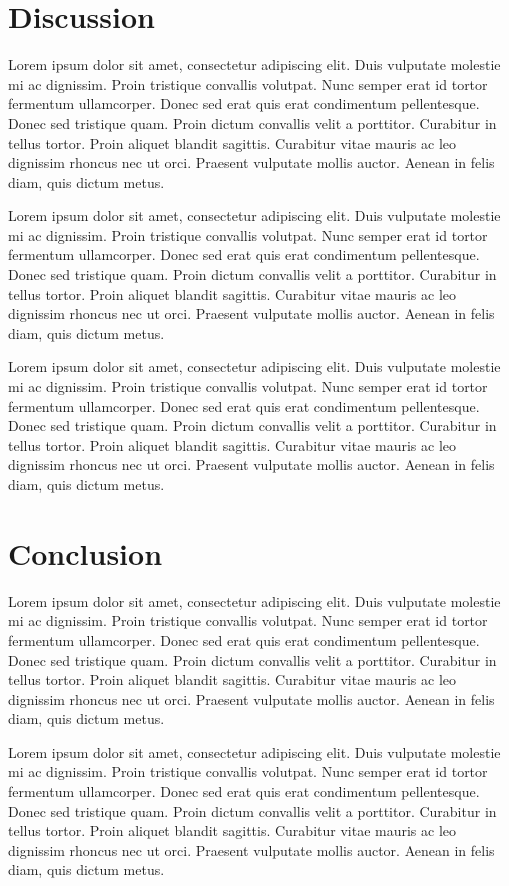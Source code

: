 \documentclass[11pt]{article}
\begin{document}
\section{Discussion}
Lorem ipsum dolor sit amet, consectetur adipiscing elit. Duis vulputate molestie mi ac dignissim. Proin tristique convallis volutpat. Nunc semper erat id tortor fermentum ullamcorper. Donec sed erat quis erat condimentum pellentesque. Donec sed tristique quam. Proin dictum convallis velit a porttitor. Curabitur in tellus tortor. Proin aliquet blandit sagittis. Curabitur vitae mauris ac leo dignissim rhoncus nec ut orci. Praesent vulputate mollis auctor. Aenean in felis diam, quis dictum metus.

Lorem ipsum dolor sit amet, consectetur adipiscing elit. Duis vulputate molestie mi ac dignissim. Proin tristique convallis volutpat. Nunc semper erat id tortor fermentum ullamcorper. Donec sed erat quis erat condimentum pellentesque. Donec sed tristique quam. Proin dictum convallis velit a porttitor. Curabitur in tellus tortor. Proin aliquet blandit sagittis. Curabitur vitae mauris ac leo dignissim rhoncus nec ut orci. Praesent vulputate mollis auctor. Aenean in felis diam, quis dictum metus.

Lorem ipsum dolor sit amet, consectetur adipiscing elit. Duis vulputate molestie mi ac dignissim. Proin tristique convallis volutpat. Nunc semper erat id tortor fermentum ullamcorper. Donec sed erat quis erat condimentum pellentesque. Donec sed tristique quam. Proin dictum convallis velit a porttitor. Curabitur in tellus tortor. Proin aliquet blandit sagittis. Curabitur vitae mauris ac leo dignissim rhoncus nec ut orci. Praesent vulputate mollis auctor. Aenean in felis diam, quis dictum metus.

\section{Conclusion}
Lorem ipsum dolor sit amet, consectetur adipiscing elit. Duis vulputate molestie mi ac dignissim. Proin tristique convallis volutpat. Nunc semper erat id tortor fermentum ullamcorper. Donec sed erat quis erat condimentum pellentesque. Donec sed tristique quam. Proin dictum convallis velit a porttitor. Curabitur in tellus tortor. Proin aliquet blandit sagittis. Curabitur vitae mauris ac leo dignissim rhoncus nec ut orci. Praesent vulputate mollis auctor. Aenean in felis diam, quis dictum metus.

Lorem ipsum dolor sit amet, consectetur adipiscing elit. Duis vulputate molestie mi ac dignissim. Proin tristique convallis volutpat. Nunc semper erat id tortor fermentum ullamcorper. Donec sed erat quis erat condimentum pellentesque. Donec sed tristique quam. Proin dictum convallis velit a porttitor. Curabitur in tellus tortor. Proin aliquet blandit sagittis. Curabitur vitae mauris ac leo dignissim rhoncus nec ut orci. Praesent vulputate mollis auctor. Aenean in felis diam, quis dictum metus.
\end{document}

